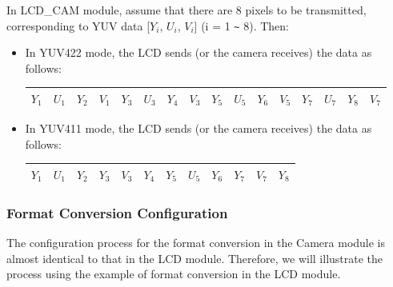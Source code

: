 \documentclass[main\_\_EN.tex]{subfiles}
\begin{document}
In LCD\_CAM module, assume that there are 8 pixels to be transmitted, corresponding to YUV data [$Y_i$, $U_i$, $V_i$] (i = 1 \verb+~+ 8). Then:
\begin{itemize}
    \item In YUV422 mode, the LCD sends (or the camera receives) the data as follows:
        \begin{table}[H]
            \centering
            \begin{tabular}{|c|c|c|c|c|c|c|c|c|c|c|c|c|c|c|c|}
            \hline
            $Y_1$ & $U_1$ & $Y_2$ & $V_1$ & $Y_3$ & $U_3$ & $Y_4$ & $V_3$ & $Y_5$ & $U_5$ & $Y_6$ & $V_5$ & $Y_7$ & $U_7$ & $Y_8$ & $V_7$ \\ \hline
            \end{tabular}
        \end{table}
    \item In YUV411 mode, the LCD sends (or the camera receives) the data as follows:
        \begin{table}[H]
            \centering
            \begin{tabular}{|c|c|c|c|c|c|c|c|c|c|c|c|}
            \hline
            $Y_1$ & $U_1$ & $Y_2$ & $Y_3$ & $V_3$ & $Y_4$ & $Y_5$ & $U_5$ & $Y_6$ & $Y_7$ & $V_7$ & $Y_8$ \\ \hline
            \end{tabular}
        \end{table}
\end{itemize}

\subsubsection{Format Conversion Configuration}
The configuration process for the format conversion in the Camera module is almost identical to that in the LCD module. Therefore, we will illustrate the process using the example of format conversion in the LCD module.
\end{document}
